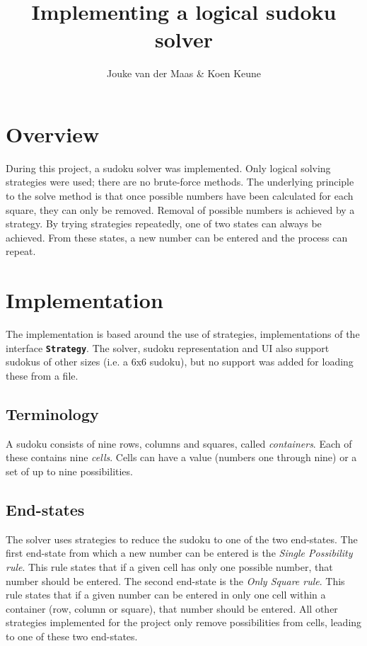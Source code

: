 \documentclass[11pt, a4paper, fleqn]{article}
\title{Implementing a logical sudoku solver}
\author{Jouke van der Maas \& Koen Keune}
\newcommand{\class}[1]{{\color{class}\textbf{\lstinline{#1}}}}
\begin{document}
\maketitle

\section{Overview}
During this project, a sudoku solver was implemented. Only
logical solving strategies were used; there are no brute-force methods.
The underlying principle to the solve method is that once
possible numbers have been calculated for each square, they can only be removed.
Removal of possible numbers is achieved by a strategy.
By trying strategies repeatedly, one of two states can always be achieved. From these
states, a new number can be entered and the process can repeat.

\section{Implementation}
The implementation is based around the use of strategies, implementations of the interface
\class{Strategy}.
The solver, sudoku representation and UI also support sudokus of other sizes (i.e. a 6x6
sudoku), but no support was added for loading these from a file.

\subsection{Terminology}
A sudoku consists of nine rows, columns and squares, called \emph{containers}. Each of these
contains nine \emph{cells}. Cells can have a value (numbers one through nine) or a set of up to nine possibilities.

\subsection{End-states}
The solver uses strategies to reduce the sudoku to one of the two end-states.
The first end-state from which a new number can be entered is the 
\emph{Single Possibility rule}. This rule states that if a given cell has only one
possible number, that number should be entered. The second end-state is the \emph{%
Only Square rule}. This rule states that if a given number can be entered in only one
cell within a container (row, column or square), that number should be entered. All
other strategies implemented for the project only remove possibilities from cells, leading
to one of these two end-states.
\end{document}
